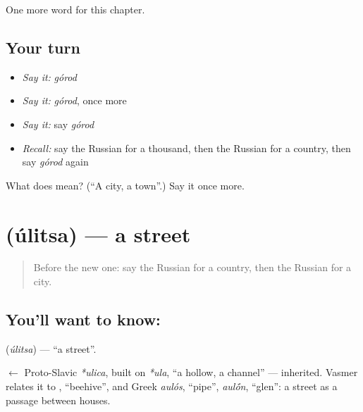 \begin{grammarlens}[title={What you've built}]
One more word for this chapter.
\end{grammarlens}

\subsection*{Your turn}
\begin{itemize}
\raggedright
  \item \emph{Say it:} \emph{górod}
  \item \emph{Say it:} \emph{górod}, once more
  \item \emph{Say it:} say \emph{górod}
  \item \emph{Recall:} say the Russian for a thousand, then the Russian for a country, then say \emph{górod} again
\end{itemize}

\begin{tcolorbox}[breakable,colback=teal!4,colframe=teal!35!black,title={Before you move on}]
What does  mean? (\textquotedblleft{}A city, a town\textquotedblright{}.) Say it once more.
\end{tcolorbox}
\section[\texorpdfstring{\ru{улица} (úlitsa)}{улица (úlitsa)}]{ (úlitsa) — a street}

\label{lesson:RU-C77-street}



\begin{quote}
Before the new one: say the Russian for a country, then the Russian for a city.
\end{quote}

\subsection*{You'll want to know: }
\textbf{} (\emph{úlitsa}) — \textquotedblleft{}a street\textquotedblright{}.

\begin{cousinweb}
\textbf{} $\leftarrow$ Proto-Slavic \emph{*ulica}, built on \emph{*ula}, \textquotedblleft{}a hollow, a channel\textquotedblright{} — inherited. Vasmer relates it to \emph{}, \textquotedblleft{}beehive\textquotedblright{}, and Greek \emph{aulós}, \textquotedblleft{}pipe\textquotedblright{}, \emph{aul\'{\={o}}n}, \textquotedblleft{}glen\textquotedblright{}: a street as a passage between houses.
\end{cousinweb}

